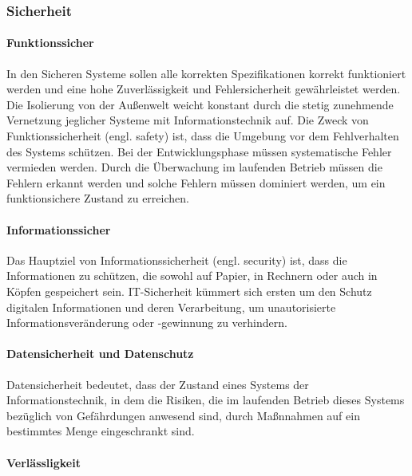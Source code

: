 \subsubsection{Sicherheit}

\paragraph{Funktionssicher}\mbox{}

In den Sicheren Systeme sollen alle korrekten Spezifikationen korrekt funktioniert werden und eine hohe Zuverlässigkeit und Fehlersicherheit gewährleistet werden. Die Isolierung von der Außenwelt weicht konstant durch die stetig zunehmende Vernetzung jeglicher Systeme mit Informationstechnik auf. Die Zweck von Funktionssicherheit (engl. safety) ist, dass die Umgebung vor dem Fehlverhalten des Systems schützen.  Bei der Entwicklungsphase müssen systematische Fehler vermieden werden. Durch die Überwachung im laufenden Betrieb müssen die Fehlern erkannt werden und solche Fehlern müssen dominiert werden, um ein funktionsichere Zustand zu erreichen\cite{hoepner2014trends}.

\paragraph{Informationssicher}\mbox{}

Das Hauptziel von Informationssicherheit (engl. security) ist, dass die Informationen zu schützen, die sowohl auf Papier, in Rechnern oder auch in Köpfen gespeichert sein. IT-Sicherheit kümmert sich ersten um den Schutz digitalen Informationen und deren Verarbeitung\cite[81]{int11sicher}, um unautorisierte Informationsveränderung oder -gewinnung zu verhindern\cite[26]{eckert2013sicherheit}.

\paragraph{Datensicherheit und Datenschutz}\mbox{}

Datensicherheit bedeutet, dass der Zustand eines Systems der Informationstechnik, in dem die Risiken, die im laufenden Betrieb dieses Systems bezüglich von Gefährdungen anwesend sind, durch Maßnnahmen auf ein bestimmtes Menge eingeschrankt sind\cite[14--15]{eberspacher1994sichere}.



\paragraph{Verlässligkeit}\mbox{}

